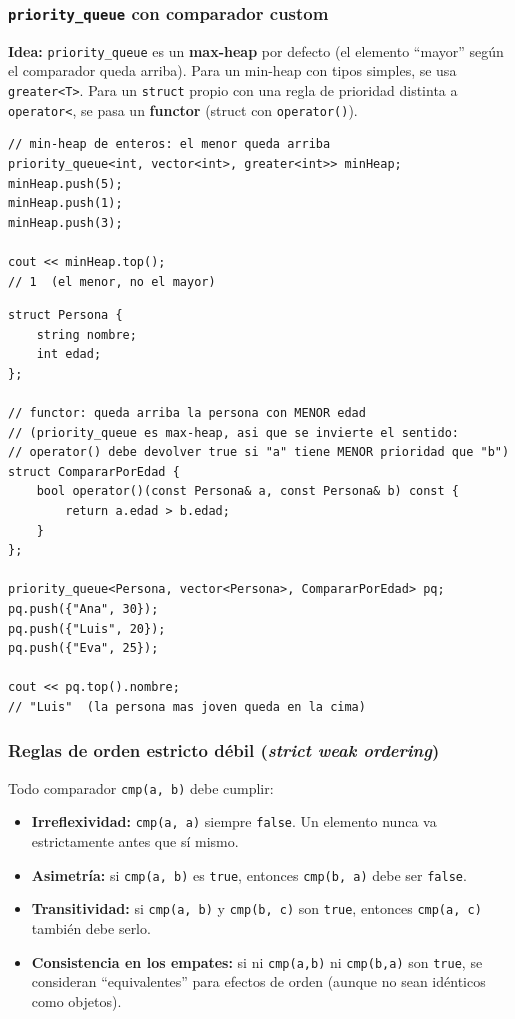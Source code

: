 \documentclass[10pt,a4paper,twocolumn]{article}
\begin{document}
\subsubsection{\texttt{priority\_queue} con comparador custom}

\textbf{Idea:} \texttt{priority\_queue} es un \textbf{max-heap} por
defecto (el elemento ``mayor'' según el comparador queda arriba). Para
un min-heap con tipos simples, se usa \texttt{greater<T>}. Para un
\texttt{struct} propio con una regla de prioridad distinta a
\texttt{operator<}, se pasa un \textbf{functor} (struct con
\texttt{operator()}).

\begin{lstlisting}[style=cpp]
// min-heap de enteros: el menor queda arriba
priority_queue<int, vector<int>, greater<int>> minHeap;
minHeap.push(5);
minHeap.push(1);
minHeap.push(3);

cout << minHeap.top();
// 1  (el menor, no el mayor)
\end{lstlisting}

\begin{lstlisting}[style=cpp]
struct Persona {
    string nombre;
    int edad;
};

// functor: queda arriba la persona con MENOR edad
// (priority_queue es max-heap, asi que se invierte el sentido:
// operator() debe devolver true si "a" tiene MENOR prioridad que "b")
struct CompararPorEdad {
    bool operator()(const Persona& a, const Persona& b) const {
        return a.edad > b.edad;
    }
};

priority_queue<Persona, vector<Persona>, CompararPorEdad> pq;
pq.push({"Ana", 30});
pq.push({"Luis", 20});
pq.push({"Eva", 25});

cout << pq.top().nombre;
// "Luis"  (la persona mas joven queda en la cima)
\end{lstlisting}


\subsubsection{Reglas de orden estricto débil (\textit{strict weak ordering})}

Todo comparador \texttt{cmp(a, b)} debe cumplir:

\begin{itemize}
    \item \textbf{Irreflexividad:} \texttt{cmp(a, a)} siempre
    \texttt{false}. Un elemento nunca va estrictamente antes que sí
    mismo.
    \item \textbf{Asimetría:} si \texttt{cmp(a, b)} es
    \texttt{true}, entonces \texttt{cmp(b, a)} debe ser
    \texttt{false}.
    \item \textbf{Transitividad:} si \texttt{cmp(a, b)} y
    \texttt{cmp(b, c)} son \texttt{true}, entonces \texttt{cmp(a, c)}
    también debe serlo.
    \item \textbf{Consistencia en los empates:} si ni
    \texttt{cmp(a,b)} ni \texttt{cmp(b,a)} son \texttt{true}, se
    consideran ``equivalentes'' para efectos de orden (aunque no
    sean idénticos como objetos).
\end{itemize}
\end{document}
